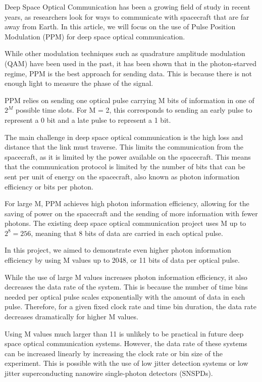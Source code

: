 \documentclass{optica-article}
\begin{document}
Deep Space Optical Communication has been a growing field of study in recent years, as researchers look for ways to communicate with spacecraft that are far away from Earth. In this article, we will focus on the use of Pulse Position Modulation (PPM) for deep space optical communication.

While other modulation techniques such as quadrature amplitude modulation (QAM) have been used in the past, it has been shown that in the photon-starved regime, PPM is the best approach for sending data. This is because there is not enough light to measure the phase of the signal.

PPM relies on sending one optical pulse carrying M bits of information in one of \(2^M\) possible time slots. For M = 2, this corresponds to sending an early pulse to represent a 0 bit and a late pulse to represent a 1 bit.

The main challenge in deep space optical communication is the high loss and distance that the link must traverse. This limits the communication from the spacecraft, as it is limited by the power available on the spacecraft. This means that the communication protocol is limited by the number of bits that can be sent per unit of energy on the spacecraft, also known as photon information efficiency or bits per photon.

For large M, PPM achieves high photon information efficiency, allowing for the saving of power on the spacecraft and the sending of more information with fewer photons. The existing deep space optical communication project uses M up to \(2^8 = 256\), meaning that 8 bits of data are carried in each optical pulse.

In this project, we aimed to demonstrate even higher photon information efficiency by using M values up to 2048, or 11 bits of data per optical pulse.

While the use of large M values increases photon information efficiency, it also decreases the data rate of the system. This is because the number of time bins needed per optical pulse scales exponentially with the amount of data in each pulse. Therefore, for a given fixed clock rate and time bin duration, the data rate decreases dramatically for higher M values.

Using M values much larger than 11 is unlikely to be practical in future deep space optical communication systems. However, the data rate of these systems can be increased linearly by increasing the clock rate or bin size of the experiment. This is possible with the use of low jitter detection systems or low jitter superconducting nanowire single-photon detectors (SNSPDs).
\end{document}
